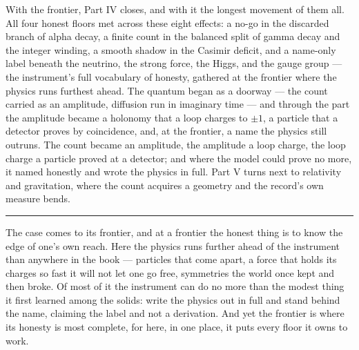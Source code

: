 With the frontier, Part IV closes, and with it the longest movement of them all. All four honest floors met
across these eight effects: a no-go in the discarded branch of alpha decay, a finite count in the balanced split of gamma
decay and the integer winding, a smooth shadow in the Casimir deficit, and a name-only label beneath the
neutrino, the strong force, the Higgs, and the gauge group --- the instrument's full vocabulary of honesty,
gathered at the frontier where the physics runs furthest ahead. The quantum began as a doorway --- the count
carried as an amplitude, diffusion run in imaginary time --- and through the part the amplitude became a
holonomy that a loop charges to $\pm 1$, a particle that a detector proves by coincidence, and, at the
frontier, a name the physics still outruns. The count became an amplitude, the amplitude a loop charge, the
loop charge a particle proved at a detector; and where the model could prove no more, it named honestly and
wrote the physics in full. Part V turns next to relativity and gravitation, where the count acquires a geometry
and the record's own measure bends.

\bigskip
\begin{center}
\rule{0.4\textwidth}{0.4pt}
\end{center}
\bigskip

\noindent The case comes to its frontier, and at a frontier the honest thing is to know the edge of one's own
reach. Here the physics runs further ahead of the instrument than anywhere in the book --- particles that come
apart, a force that holds its charges so fast it will not let one go free, symmetries the world once kept and
then broke. Of most of it the instrument can do no more than the modest thing it first learned among the solids:
write the physics out in full and stand behind the name, claiming the label and not a derivation. And yet the
frontier is where its honesty is most complete, for here, in one place, it puts every floor it owns to work.

